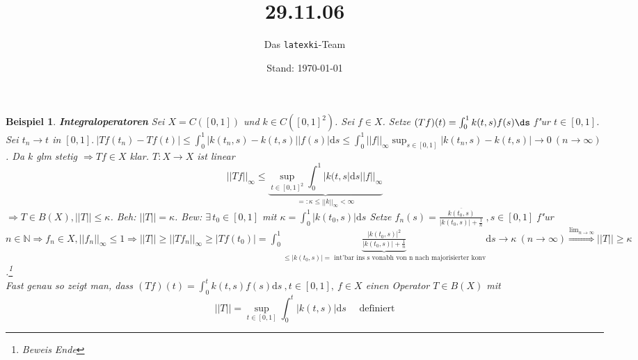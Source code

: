 \documentclass[a4paper,11pt]{book}
\title{29.11.06}
\author{Das \texttt{latexki}-Team\\[8 cm]}
\date{Stand: \today}
\newcommand{\N}{{\mathbb N}}
\newcommand{\d}{\mbox{d}}
\newcommand{\sn}[1]{||#1||_{\infty}}
\def\d{\mbox{d}}
\newtheorem{Bsp}[Def]{Beispiel}
\theoremstyle{nonumberplain}
\begin{document}
\maketitle

\begin{Bsp}
\textbf{Integraloperatoren}
Sei $X = C([0,1])$ und $k \in C([0,1]^2)$. Sei $f \in X$. Setze $(Tf)(t) = \int_0^1 k(t,s)f(s)\ds$ f"ur $t \in [0,1]$. Sei $t_n \rightarrow t$ in $[0,1].\ |Tf(t_n)-Tf(t)| \leq \int_0^1 |k(t_n,s)-k(t,s)||f(s)|\d s \leq \int_0^1 \sn{f} \sup_{s \in [0,1]} |k(t_n,s)-k(t,s)| \rightarrow 0 \ (n \rightarrow \infty)$. Da $k$ glm stetig $\Rightarrow Tf \in X$ klar. $T: X \rightarrow X$ ist linear
\[
\sn{Tf} \leq \underbrace{ \sup_{t \in [0,1]^2} \int_0^1 |k(t,s|\d s \sn{f}}_{=: \kappa \leq \sn{k} < \infty}
\]
$\Rightarrow T \in B(X), ||T|| \leq \kappa$. \emph{Beh:} $||T|| = \kappa$. \emph{Bew:} $\exists\, t_0 \in [0,1]$ mit $\kappa = \int_0^1 |k(t_0,s)|\d s$ Setze $f_n(s) = \frac{\overline{k(t_0,s)}}{|k(t_0,s)| + \frac1{n}} \ ,s \in [0,1]$ f"ur $n \in \N \Rightarrow f_n \in X, \sn{f_n} \leq 1 \Rightarrow ||T|| \geq \sn{Tf_n} \geq |Tf(t_0)| = \int_0^1 \underbrace{\frac{|k(t_0,s)|^2}{|k(t_0,s)| + \frac1{n}}}_{\leq |k(t_0,s)| = \mbox{ int'bar ins s vonabh von n nach majorisierter konv}} \d s \rightarrow \kappa \ (n \rightarrow \infty) \stackrel{\lim_{n \rightarrow \infty}}{\Longrightarrow} ||T|| \geq \kappa$.\footnote{Beweis Ende}\\
Fast genau so zeigt man, dass $(Tf)(t) = \int_0^t k(t,s)f(s) \d s \ ,t \in [0,1],\ f\in X$ einen Operator $T \in B(X)$ mit
\[
||T|| = \sup_{t \in [0,1]} \int_0^t |k(t,s)|\d s \quad \mbox{ definiert}
\]
\end{Bsp}
\end{document}
